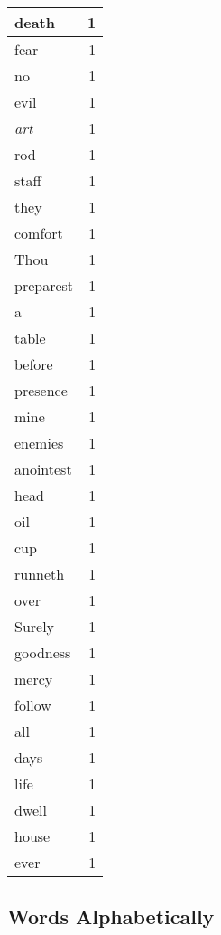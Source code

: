 \begin{center}
\begin{longtable}{l|r}
death & 1 \\ \hline
fear & 1 \\ \hline
no & 1 \\ \hline
evil & 1 \\ \hline
\emph{art} & 1 \\ \hline
rod & 1 \\ \hline
staff & 1 \\ \hline
they & 1 \\ \hline
comfort & 1 \\ \hline
Thou & 1 \\ \hline
preparest & 1 \\ \hline
a & 1 \\ \hline
table & 1 \\ \hline
before & 1 \\ \hline
presence & 1 \\ \hline
mine & 1 \\ \hline
enemies & 1 \\ \hline
anointest & 1 \\ \hline
head & 1 \\ \hline
oil & 1 \\ \hline
cup & 1 \\ \hline
runneth & 1 \\ \hline
over & 1 \\ \hline
Surely & 1 \\ \hline
goodness & 1 \\ \hline
mercy & 1 \\ \hline
follow & 1 \\ \hline
all & 1 \\ \hline
days & 1 \\ \hline
life & 1 \\ \hline
dwell & 1 \\ \hline
house & 1 \\ \hline
ever & 1 \\ \hline
\end{longtable}
\end{center}



\normalsize



\subsection{Words Alphabetically}

